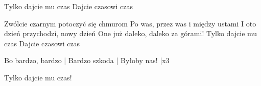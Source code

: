 \documentclass[../../../songbook.tex]{subfiles}
\begin{document}
Tylko dajcie mu czas				 \newline
Dajcie czasowi czas					 \newline

Zwólcie czarnym potoczyć się chmurom	 \newline
Po was, przez was i między ustami		 \newline
I oto dzień przychodzi, nowy dzień		 \newline
One już daleko, daleko za górami!		 \newline
Tylko dajcie mu czas					 \newline
Dajcie czasowi czas						 \newline

Bo bardzo, bardzo		 \quad |   \newline
Bardzo szkoda			 \quad |   \newline
Byłoby nas!		 		 \quad |x3 \newline

Tylko dajcie mu czas!		 \newline
\end{document}
